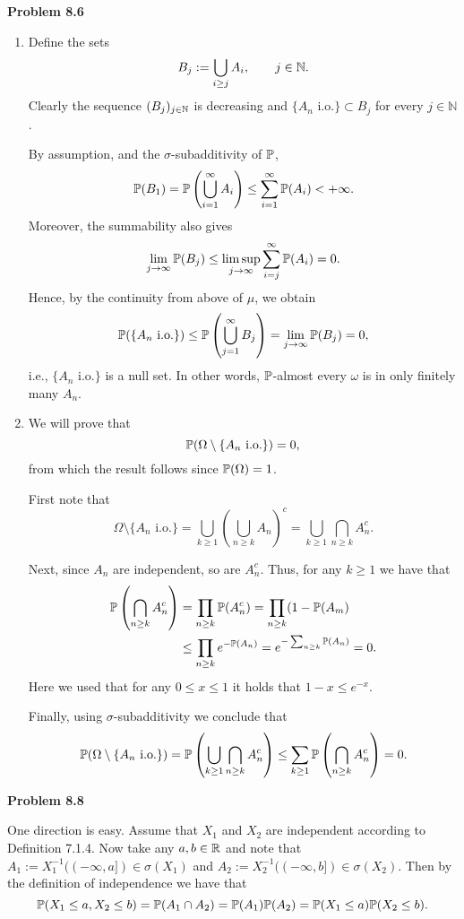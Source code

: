 \documentclass{lecturenotes}
\begin{document}
\textbf{Problem 8.6}
\begin{enumerate}[label={(\alph*)}]
\item Define the sets
\[
	B_j := \bigcup_{i \ge j} A_i,\qquad j\in\mathbb N.
\]
Clearly the sequence $(B_j)_{j\in\mathbb N}$ is decreasing and $\{A_n \text{ i.o.}\}\subset B_j$ for every $j \in \mathbb{N}$. 

By assumption, and the $\sigma$-subadditivity of $\mathbb P$,
\[
\mathbb P(B_1) = \mathbb P\left(\bigcup_{i=1}^\infty A_i \right) \leq \sum_{i=1}^\infty \mathbb P(A_i) < +\infty.
\]
Moreover, the summability also gives
\[
	\lim_{j\to\infty}\mathbb P(B_j) \leq \limsup_{j\to\infty}\sum_{i=j}^\infty \mathbb P(A_i) = 0.
\]
Hence, by the continuity from above of $\mu$, we obtain
\[
	\mathbb P(\{A_n \text{ i.o.}\}) \le \mathbb P\left(\bigcup_{j=1}^\infty B_j\right) = \lim_{j\to \infty} \mathbb P(B_j) = 0,
\]
i.e., $\{A_n \text{ i.o.}\}$ is a null set. In other words, $\mathbb P$-almost every $\omega$ is in only finitely many $A_n$.
\item We will prove that 
\[
	\mathbb P(\Omega \setminus \{A_n \text{ i.o.}\}) = 0,
\]
from which the result follows since $\mathbb P(\Omega) = 1$.

First note that
\[
	\Omega \setminus \{A_n \text{ i.o.}\} = \bigcup_{k \ge 1} \left(\bigcup_{n \ge k} A_n\right)^c
	= \bigcup_{k \ge 1} \bigcap_{n \ge k} A_n^c.
\]

Next, since $A_n$ are independent, so are $A_n^c$. Thus, for any $k \ge 1$ we have that
\begin{align*}
	\mathbb P\left(\bigcap_{n \ge k} A_n^c\right) &= \prod_{n \ge k} \mathbb P(A_n^c) = \prod_{n \ge k} (1-\mathbb P(A_m)\\
	&\le \prod_{n \ge k} e^{-\mathbb P(A_n)} = e^{-\sum_{n \ge k} \mathbb P(A_n)} = 0.
\end{align*}
Here we used that for any $0 \le x \le 1$ it holds that $1-x \le e^{-x}$.

Finally, using $\sigma$-subadditivity we conclude that
\[
	\mathbb P(\Omega \setminus \{A_n \text{ i.o.}\}) = \mathbb P\left(\bigcup_{k \ge 1} \bigcap_{n \ge k} A_n^c\right)
	\le \sum_{k \ge 1} \mathbb P\left(\bigcap_{n \ge k} A_n^c\right) = 0.
\]
\end{enumerate}

\bigskip

\textbf{Problem 8.8}

One direction is easy. Assume that $X_1$ and $X_2$ are independent according to Definition 7.1.4. Now take any $a,b \in \mathbb R$ and note that $A_1 := X_1^{-1}((-\infty,a]) \in \sigma(X_1)$ and $A_2 := X_2^{-1}((-\infty, b]) \in \sigma(X_2)$. Then by the definition of independence we have that
\[
	\mathbb{P}(X_1 \le a, X_2 \le b) = \mathbb P(A_1 \cap A_2) = \mathbb P(A_1) \mathbb P(A_2) = \mathbb{P}(X_1 \le a) \mathbb{P}(X_2 \le b).
\]
\end{document}
